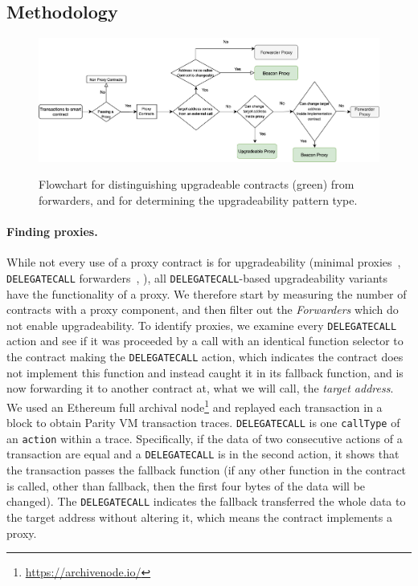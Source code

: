 \subsection{Methodology} 

\begin{figure}[t!]
 \includegraphics[width=1\textwidth]{figures/New-method.png}\label{flowchart}
 \caption[Flowchart for Upgradeable Proxy Finder]{Flowchart for distinguishing upgradeable contracts (green) from forwarders, and for determining the upgradeability pattern type.}
\end{figure}


\paragraph{Finding proxies.} While not every use of a proxy contract is for upgradeability (\eg minimal proxies~\cite{minimalProxy}, \texttt{DELEGATECALL} forwarders~\cite{delegatecallForwarders}, \etc), all \texttt{DELEGATECALL}-based upgradeability variants have the functionality of a proxy. We therefore start by measuring the number of contracts with a proxy component, and then filter out the \textit{Forwarders} which do not enable upgradeability. To identify proxies, we examine every \texttt{DELEGATECALL} action and see if it was proceeded by a call with an identical function selector to the contract making the \texttt{DELEGATECALL} action, which indicates   the contract does not implement this function and instead caught it in its fallback function, and is now forwarding it to another contract at, what we will call, the \textit{target address}. We used an Ethereum full archival node\footnote{\url{https://archivenode.io/}} and replayed each transaction in a block to obtain Parity VM transaction traces. \texttt{DELEGATECALL} is one \texttt{callType} of an \texttt{action} within a trace. Specifically, if the data of two consecutive actions of a transaction are equal and a \texttt{DELEGATECALL} is in the second action, it shows that the transaction passes the fallback function (if any other function in the contract is called, other than fallback, then the first four bytes of the data will be changed). The \texttt{DELEGATECALL} indicates the fallback transferred the whole data to the target address without altering it, which means the contract implements a proxy.

